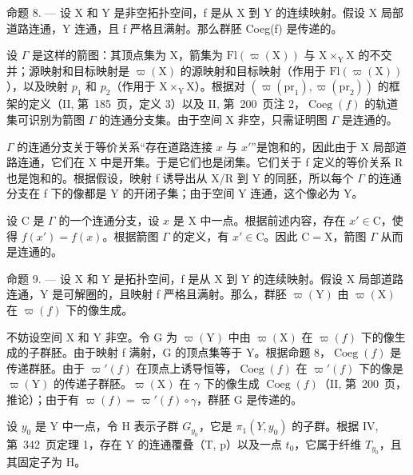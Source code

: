 命题 8. --- 设 X 和 Y 是非空拓扑空间，f 是从 X 到 Y 的连续映射。假设 X 局部道路连通，Y 连通，且 f 严格且满射。那么群胚 Coeg(f) 是传递的。

设 \(\Gamma\) 是这样的箭图：其顶点集为 X，箭集为 \(\mathrm{Fl}(\varpi(\mathrm{X}))\) 与 \(\mathrm{X}\times_{\mathrm{Y}}\mathrm{X}\) 的不交并；源映射和目标映射是 \(\varpi(\mathrm{X})\) 的源映射和目标映射（作用于 \(\mathrm{Fl}(\varpi(\mathrm{X}))\)），以及映射 \(p_1\) 和 \(p_2\)（作用于 \(\mathrm{X}\times_{\mathrm{Y}}\mathrm{X}\)）。根据对 \((\varpi(\mathrm{pr}_1), \varpi(\mathrm{pr}_2))\) 的框架的定义（II, 第~185~页，定义 3）以及 II, 第~200~页注 2，\(\operatorname{Coeg}(f)\) 的轨道集可识别为箭图 \(\Gamma\) 的连通分支集。由于空间 X 非空，只需证明图 \(\Gamma\) 是连通的。

\(\Gamma\) 的连通分支关于等价关系“存在道路连接 \(x\) 与 \(x'\)”是饱和的，因此由于 X 局部道路连通，它们在 X 中是开集。于是它们也是闭集。它们关于 f 定义的等价关系 R 也是饱和的。根据假设，映射 f 诱导出从 X/R 到 Y 的同胚，所以每个 \(\Gamma\) 的连通分支在 f 下的像都是 Y 的开闭子集；由于空间 Y 连通，这个像必为 Y。

设 C 是 \(\Gamma\) 的一个连通分支，设 \(x\) 是 X 中一点。根据前述内容，存在 \(x' \in \mathrm{C}\)，使得 \(f(x') = f(x)\)。根据箭图 \(\Gamma\) 的定义，有 \(x' \in \mathrm{C}\)。因此 \(\mathrm{C} = \mathrm{X}\)，箭图 \(\Gamma\) 从而是连通的。

命题 9. --- 设 X 和 Y 是拓扑空间，f 是从 X 到 Y 的连续映射。假设 X 局部道路连通，Y 是可解圈的，且映射 f 严格且满射。那么，群胚 \(\varpi(\mathrm{Y})\) 由 \(\varpi(\mathrm{X})\) 在 \(\varpi(f)\) 下的像生成。

不妨设空间 X 和 Y 非空。令 G 为 \(\varpi(\mathrm{Y})\) 中由 \(\varpi(\mathrm{X})\) 在 \(\varpi(f)\) 下的像生成的子群胚。由于映射 f 满射，G 的顶点集等于 Y。根据命题 8，\(\operatorname{Coeg}(f)\) 是传递群胚。由于 \(\varpi'(f)\) 在顶点上诱导恒等，\(\operatorname{Coeg}(f)\) 在 \(\varpi'(f)\) 下的像是 \(\varpi(\mathrm{Y})\) 的传递子群胚。\(\varpi(\mathrm{X})\) 在 \(\gamma\) 下的像生成 \(\operatorname{Coeg}(f)\)（II, 第~200~页，推论）；由于有 \(\varpi(f) = \varpi'(f) \circ \gamma\)，群胚 G 是传递的。

设 \(y_{0}\) 是 Y 中一点，令 H 表示子群 \(G_{y_{0}}\)，它是 \(\pi_{1}(Y, y_{0})\) 的子群。根据 IV, 第~342~页定理 1，存在 Y 的连通覆叠（T, p）以及一点 \(t_{0}\)，它属于纤维 \(T_{y_{0}}\)，且其固定子为 H。

